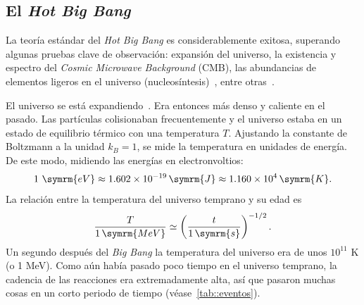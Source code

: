 \subsection{El \textit{Hot Big Bang}}
La teoría estándar del \textit{Hot Big Bang} es considerablemente exitosa, superando algunas pruebas clave de observación: expansión del universo, la existencia y espectro del \textit{Cosmic Microwave Background} (CMB), las abundancias de elementos ligeros en el universo (nucleosíntesis)~\cite{gamow1946expanding,alpher1948evolution,alpher1953physical}, entre otras~\cite{liddle1998introduction}.

El universo se está expandiendo~\cite{hubble1929relation}. Era entonces más denso y caliente en el pasado. Las partículas colisionaban frecuentemente y el universo estaba en un estado de equilibrio térmico con una temperatura \(T\). Ajustando la constante de Boltzmann a la unidad \(k_B=1\), se mide la temperatura en unidades de energía. De este modo, midiendo las energías en electronvoltios:
\begin{equation}
    1\ \symrm{eV}\approx 1.602\times 10^{-19}\,\symrm{J}\approx 1.160\times 10^{4}\,\symrm{K}.
\end{equation}
La relación entre la temperatura del universo temprano y su edad es~\cite{baumann2022cosmology}
\begin{equation}
    \frac{T}{1\,\symrm{MeV}}\simeq \left(\frac{t}{1\,\symrm{s}}\right)^{-1/2}.
\end{equation}
Un segundo después del \textit{Big Bang} la temperatura del universo era de unos \(10^{11}\) K (o 1 MeV). Como aún había pasado poco tiempo en el universo temprano, la cadencia de las reacciones era extremadamente alta, así que pasaron muchas cosas en un corto periodo de tiempo (véase~\autoref{tab::eventos}).
